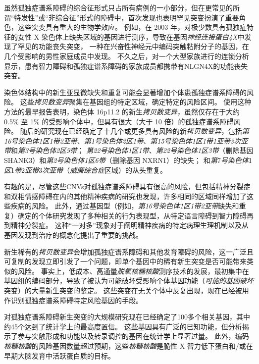 虽然孤独症谱系障碍的综合征形式只占所有病例的一小部分，但在更常见的所谓“特发性”或“非综合征”形式的障碍中，首次发现也表明罕见突变扮演了重要角色，这些突变具有重大的生物学效应。
例如，在 2003 年，对极少数具有孤独症特征的女性 X 染色体上缺失区域的基因进行测序，导致在基因\textit{神经连接蛋白4X}中发现了罕见的功能丧失突变， 一种在兴奋性神经元中编码突触粘附分子的基因，在几个受影响的男性家庭成员中发现。
不久之后，对一个大型家族进行的连锁分析显示，患有智力障碍和孤独症谱系障碍的家族成员都携带有NLGN4X的功能丧失突变。


染色体结构中的新生亚显微缺失和重复可能会显著增加个体患孤独症谱系障碍的风险。
这些\textit{拷贝数变异}聚集在基因组的特定区域，确定特定的风险区间。
使用这种方法的最早报告表明，染色体 16p11.2 的新生\textit{拷贝数变异}，虽然仅存在于大约 0.5\% 至 1\% 的受影响个体中，但具有很大（大于 10 倍）的孤独症谱系障碍风险。
随后的研究现在已经确定了十几个或更多具有风险的新\textit{拷贝数变异}，包括\textit{第16号染色体1区1带2亚带}、\textit{第1号染色体2区1带}、\textit{第15号染色体1区1带1亚带3次亚带}和\textit{第3号染色体2区9带}；
\textit{第22号染色体1区1带}、\textit{第22号染色体1区3带}（删除基因 SHANK3）和\textit{第2号染色体1区6带}（删除基因 NXRN1）的缺失；
和\textit{第}7\textit{号染色体}1\textit{区}1\textit{带}2\textit{亚带}3\textit{次亚带}（\textit{威廉综合症}区域）的从头重复。


有趣的是，尽管这些CNVs对孤独症谱系障碍具有很高的风险，但包括精神分裂症和双相情感障碍在内的其他精神疾病的研究也发现，许多相同的区域同样增加了这些疾病的风险。
此外，通过基因型（例如，\textit{第16号染色体1区1带2亚带}缺失和重复）确定的个体研究发现了多种相关的行为表现型，从特定语言障碍到智力障碍再到精神分裂症。
这种“一对多”现象对于阐明精神疾病的特定病理生理机制以及从基因发现到治疗的概念化提出了重要的挑战。


新生稀有的\textit{拷贝数变异}会增加孤独症谱系障碍和其他发育障碍的风险，这一广泛且可复制的发现立即引发了一个问题，即单个基因中的稀有新生突变是否可能带来类似的风险。
事实上，低成本、高通量\textit{脱氧核糖核酸}测序技术的发展，最初集中在基因组的编码部分，导致了被认为可能破坏受影响个体基因功能（\textit{可能的基因破坏}突变）的大量新生突变的鉴定。
这些突变在无关个体中反复出现，现在已经被用作识别孤独症谱系障碍特定风险基因的手段。

对孤独症谱系障碍新生突变的大规模研究现在已经确定了100多个相关基因，其中约45个达到了统计学上的最高度置信。
这些基因具有广泛的已知功能，但分析揭示了参与突触形成和功能以及转录调控的基因在统计学上显著过量。
此外，编码\textit{核糖核酸}的风险基因数量超过预期，这些\textit{核糖核酸}是脆性 X 智力低下蛋白和/或在早期大脑发育中活跃蛋白质的目标。



